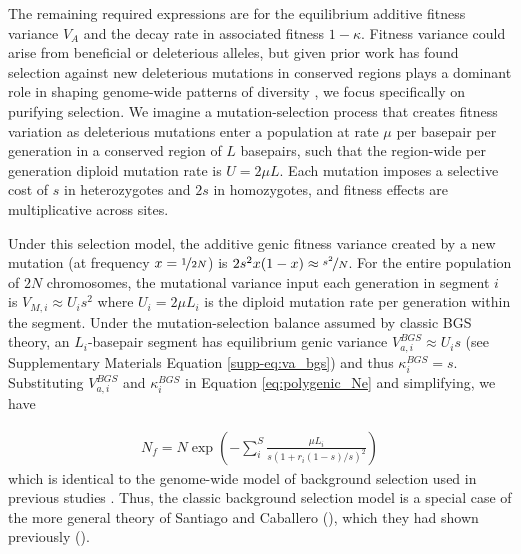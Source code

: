 \documentclass[11pt]{article}
\begin{document}
The remaining required expressions are for the equilibrium additive fitness
variance $V_A$ and the decay rate in associated fitness $1-\kappa$. Fitness
variance could arise from beneficial or deleterious alleles, but given
prior work has found selection against new deleterious mutations in conserved regions plays a dominant role in shaping genome-wide patterns of diversity \parencite{McVicker2009-ax,Murphy2022-sj}, we focus specifically on purifying selection. We imagine a mutation-selection process that creates fitness variation as deleterious mutations enter a population at rate
$\mu$ per basepair per generation in a conserved region of $L$ basepairs, such
that the region-wide per generation diploid mutation rate is $U = 2 \mu L$.
Each mutation imposes a selective cost of $s$ in heterozygotes and $2s$ in
homozygotes, and fitness effects are multiplicative across sites. 

Under this selection model, the additive genic fitness variance created by a
new mutation (at frequency $x=\nicefrac{1}{2N}$) is $2s^2 x(1-x) \approx
\nicefrac{s^2}{N}$. For the entire population of $2N$ chromosomes, the mutational variance input each generation in segment $i$ is $V_{M,i} \approx
U_is^2$ where $U_i = 2\mu L_i$ is the diploid mutation rate per generation
within the segment. Under the mutation-selection balance assumed by classic BGS
theory, an $L_i$-basepair segment has equilibrium genic variance $V_{a,i}^{BGS}
\approx U_i s$ (see Supplementary Materials Equation \ref{supp-eq:va_bgs}) and
thus $\kappa_i^{BGS} = s$. Substituting $V_{a,i}^{BGS}$ and $\kappa_i^{BGS}$ in
Equation \eqref{eq:polygenic_Ne} and simplifying, we have

\begin{align}
    N_f = N \exp \left( - \sum_i^S \frac{\mu L_i}{s(1 + r_i(1-s)/s)^2} \right) 
\end{align}
%
which is identical to the genome-wide model of background selection used in
previous studies \parencite{McVicker2009-ax,Elyashiv2016-vt,Murphy2022-sj}.
Thus, the classic background selection model is a special case of the more
general theory of Santiago and Caballero (\citeyear{Santiago2016-mu}), which
they had shown previously (\citeyear{Santiago1998-bs}).
\end{document}
